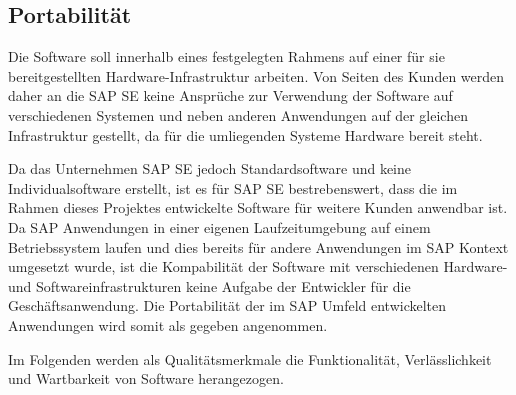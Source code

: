         \subsection{Portabilität}

            Die Software soll innerhalb eines festgelegten Rahmens auf einer für sie bereitgestellten Hardware-Infrastruktur arbeiten. Von Seiten des Kunden werden daher an die SAP SE keine Ansprüche zur Verwendung der Software auf verschiedenen Systemen und neben anderen Anwendungen auf der gleichen Infrastruktur gestellt, da für die umliegenden Systeme Hardware bereit steht.

            Da das Unternehmen SAP SE jedoch Standardsoftware und keine Individualsoftware erstellt, ist es für SAP SE bestrebenswert, dass die im Rahmen dieses Projektes entwickelte Software für weitere Kunden anwendbar ist. Da SAP Anwendungen in einer eigenen Laufzeitumgebung auf einem Betriebssystem laufen und dies bereits für andere Anwendungen im SAP Kontext umgesetzt wurde, ist die Kompabilität der Software mit verschiedenen Hardware- und Softwareinfrastrukturen keine Aufgabe der Entwickler für die Geschäftsanwendung.
            Die Portabilität der im SAP Umfeld entwickelten Anwendungen wird somit als gegeben angenommen.

            Im Folgenden werden als Qualitätsmerkmale die Funktionalität, Verlässlichkeit und Wartbarkeit von Software herangezogen. 